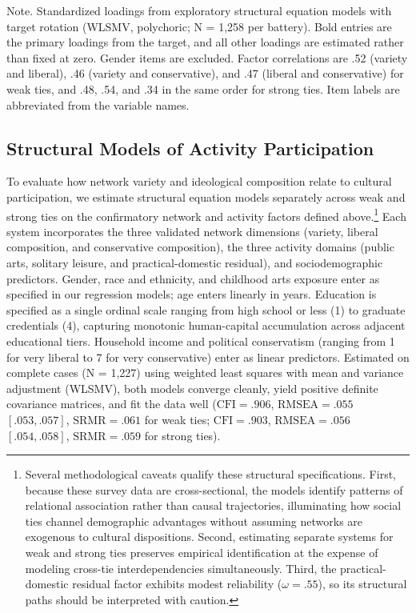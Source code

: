 \documentclass[
  12pt
]{article}
\begin{document}
Note. Standardized loadings from exploratory structural equation models with target rotation (WLSMV, polychoric; N = 1,258 per battery). Bold entries are the primary loadings from the target, and all other loadings are estimated rather than fixed at zero. Gender items are excluded. Factor correlations are .52 (variety and liberal), .46 (variety and conservative), and .47 (liberal and conservative) for weak ties, and .48, .54, and .34 in the same order for strong ties. Item labels are abbreviated from the variable names.


\subsection{Structural Models of Activity Participation}\label{structural-models-of-activity-participation}

To evaluate how network variety and ideological composition relate to cultural participation, we estimate structural equation models separately across weak and strong ties on the confirmatory network and activity factors defined above.\footnote{Several methodological caveats qualify these structural specifications. First, because these survey data are cross-sectional, the models identify patterns of relational association rather than causal trajectories, illuminating how social ties channel demographic advantages without assuming networks are exogenous to cultural dispositions. Second, estimating separate systems for weak and strong ties preserves empirical identification at the expense of modeling cross-tie interdependencies simultaneously. Third, the practical-domestic residual factor exhibits modest reliability ($\omega = .55$), so its structural paths should be interpreted with caution.} Each system incorporates the three validated network dimensions (variety, liberal composition, and conservative composition), the three activity domains (public arts, solitary leisure, and practical-domestic residual), and sociodemographic predictors. Gender, race and ethnicity, and childhood arts exposure enter as specified in our regression models; age enters linearly in years. Education is specified as a single ordinal scale ranging from high school or less (1) to graduate credentials (4), capturing monotonic human-capital accumulation across adjacent educational tiers. Household income and political conservatism (ranging from 1 for very liberal to 7 for very conservative) enter as linear predictors. Estimated on complete cases (N = 1,227) using weighted least squares with mean and variance adjustment (WLSMV), both models converge cleanly, yield positive definite covariance matrices, and fit the data well ($\text{CFI} = .906$, $\text{RMSEA} = .055$ $[.053, .057]$, $\text{SRMR} = .061$ for weak ties; $\text{CFI} = .903$, $\text{RMSEA} = .056$ $[.054, .058]$, $\text{SRMR} = .059$ for strong ties).
\end{document}
